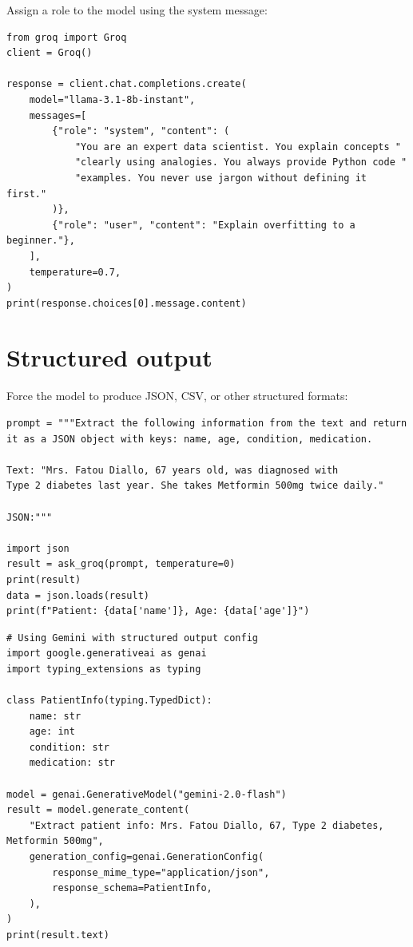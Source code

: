 Assign a role to the model using the system message:

\begin{verbatim}
from groq import Groq
client = Groq()

response = client.chat.completions.create(
    model="llama-3.1-8b-instant",
    messages=[
        {"role": "system", "content": (
            "You are an expert data scientist. You explain concepts "
            "clearly using analogies. You always provide Python code "
            "examples. You never use jargon without defining it first."
        )},
        {"role": "user", "content": "Explain overfitting to a beginner."},
    ],
    temperature=0.7,
)
print(response.choices[0].message.content)
\end{verbatim}

\section{Structured output}

Force the model to produce JSON, CSV, or other structured formats:

\begin{verbatim}
prompt = """Extract the following information from the text and return
it as a JSON object with keys: name, age, condition, medication.

Text: "Mrs. Fatou Diallo, 67 years old, was diagnosed with
Type 2 diabetes last year. She takes Metformin 500mg twice daily."

JSON:"""

import json
result = ask_groq(prompt, temperature=0)
print(result)
data = json.loads(result)
print(f"Patient: {data['name']}, Age: {data['age']}")
\end{verbatim}

\begin{verbatim}
# Using Gemini with structured output config
import google.generativeai as genai
import typing_extensions as typing

class PatientInfo(typing.TypedDict):
    name: str
    age: int
    condition: str
    medication: str

model = genai.GenerativeModel("gemini-2.0-flash")
result = model.generate_content(
    "Extract patient info: Mrs. Fatou Diallo, 67, Type 2 diabetes, Metformin 500mg",
    generation_config=genai.GenerationConfig(
        response_mime_type="application/json",
        response_schema=PatientInfo,
    ),
)
print(result.text)
\end{verbatim}

